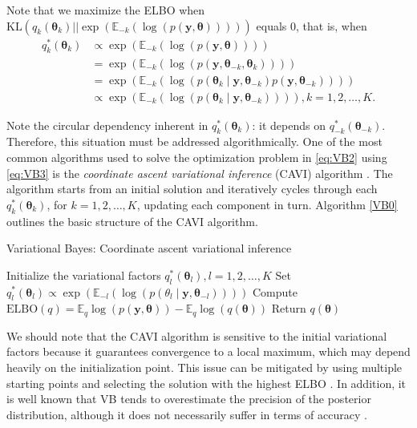 Note that we maximize the ELBO when $\text{KL}(q_k(\boldsymbol{\theta}_k)||\exp\left(\mathbb{E}_{-k}(\log\left(p(\boldsymbol{y}, \boldsymbol{\theta})\right))\right))$ equals 0, that is, when
\begin{align}\label{eq:VB3}
	q_k^*(\boldsymbol{\theta}_k)&\propto\exp\left(\mathbb{E}_{-k}(\log\left(p(\boldsymbol{y}, \boldsymbol{\theta})\right))\right)\nonumber\\
	&=\exp\left(\mathbb{E}_{-k}(\log\left(p(\boldsymbol{y}, \boldsymbol{\theta}_{-k},\boldsymbol{\theta}_k)\right))\right)\nonumber\\
	&=\exp\left(\mathbb{E}_{-k}(\log\left(p({\boldsymbol{\theta}}_{k}\mid\boldsymbol{y},\boldsymbol\theta_{-k})p(\boldsymbol{y},\boldsymbol\theta_{-k})\right))\right)\nonumber\\
	&\propto \exp\left(\mathbb{E}_{-k}(\log\left(p(\boldsymbol{\theta}_{k}\mid\boldsymbol{y},\boldsymbol\theta_{-k})\right))\right), k=1,2,\dots,K.
\end{align}

Note the circular dependency inherent in $q_k^*(\boldsymbol{\theta}_k)$: it depends on $q_{-k}^*(\boldsymbol{\theta}_{-k})$. Therefore, this situation must be addressed algorithmically. One of the most common algorithms used to solve the optimization problem in \ref{eq:VB2} using \ref{eq:VB3} is the \textit{coordinate ascent variational inference} (CAVI) algorithm \cite{bishop2006pattern}. The algorithm starts from an initial solution and iteratively cycles through each $q_k^*(\boldsymbol{\theta}_k)$, for $k = 1, 2, \dots, K$, updating each component in turn. Algorithm \ref{VB0} outlines the basic structure of the CAVI algorithm.
\begin{algorithm}
	\caption{Variational Bayes: Coordinate ascent variational inference}\label{VB0}
	\begin{algorithmic}[1]
		\State Initialize the variational factors $q_l^*(\boldsymbol{\theta}_l), l=1,2,\dots,K$
				\State Set $q_l^*(\boldsymbol{\theta}_l)\propto \exp\left(\mathbb{E}_{-l}(\log\left(p({\theta}_{l}\mid\boldsymbol{y},\boldsymbol\theta_{-l})\right))\right)$
			\EndFor
		\State Compute $\text{ELBO}(q)=\mathbb{E}_q\log(p(\boldsymbol{y}, \boldsymbol{\theta}))-\mathbb{E}_q\log(q(\boldsymbol{\theta}))$
		\EndWhile 
		\State Return $q(\boldsymbol{\theta})$ 
	\end{algorithmic}
\end{algorithm}
 
We should note that the CAVI algorithm is sensitive to the initial variational factors because it guarantees convergence to a local maximum, which may depend heavily on the initialization point. This issue can be mitigated by using multiple starting points and selecting the solution with the highest ELBO \cite{blei2006variational}. In addition, it is well known that VB tends to overestimate the precision of the posterior distribution, although it does not necessarily suffer in terms of accuracy \cite{blei2017variational}.

